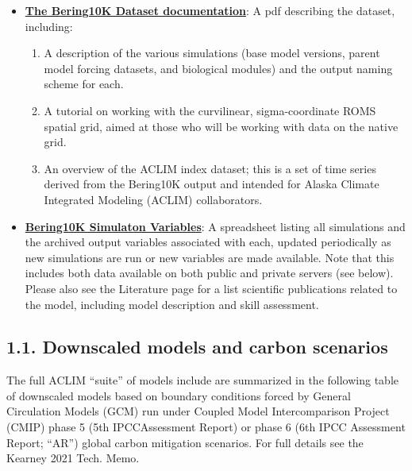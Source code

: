 \documentclass[
]{article}
\begin{document}
\begin{itemize}
\item
  \href{https://drive.google.com/file/d/1GlITTIvbs2gRBMNIxdDI15cZU6mH4ckg/view}{\textbf{The
  Bering10K Dataset documentation}}: A pdf describing the dataset,
  including:

  \begin{enumerate}
  \def\labelenumi{\arabic{enumi}.}
  \item
    A description of the various simulations (base model versions,
    parent model forcing datasets, and biological modules) and the
    output naming scheme for each.
  \item
    A tutorial on working with the curvilinear, sigma-coordinate ROMS
    spatial grid, aimed at those who will be working with data on the
    native grid.
  \item
    An overview of the ACLIM index dataset; this is a set of time series
    derived from the Bering10K output and intended for Alaska Climate
    Integrated Modeling (ACLIM) collaborators.
  \end{enumerate}
\item
  \href{https://drive.google.com/file/d/1C1FCxRMBm0uBv2wEKwrGfHmLnjt_gFvG/view}{\textbf{Bering10K
  Simulaton Variables}}: A spreadsheet listing all simulations and the
  archived output variables associated with each, updated periodically
  as new simulations are run or new variables are made available. Note
  that this includes both data available on both public and private
  servers (see below). Please also see the Literature page for a list
  scientific publications related to the model, including model
  description and skill assessment.
\end{itemize}

\hypertarget{downscaled-models-and-carbon-scenarios}{%
\subsection{1.1. Downscaled models and carbon
scenarios}\label{downscaled-models-and-carbon-scenarios}}

The full ACLIM ``suite'' of models include are summarized in the
following table of downscaled models based on boundary conditions forced
by General Circulation Models (GCM) run under Coupled Model
Intercomparison Project (CMIP) phase 5 (5th IPCCAssessment Report) or
phase 6 (6th IPCC Assessment Report; ``AR'') global carbon mitigation
scenarios. For full details see the Kearney 2021 Tech. Memo.
\end{document}
